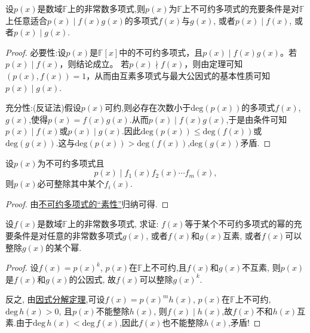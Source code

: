 \documentclass[../../main.tex]{subfiles}
\begin{document}
\begin{theorem}[不可约多项式的“素性”]\label{theorem:不可约多项式的“素性”}
设\(p(x)\)是数域\(\mathbb{F}\)上的非常数多项式,则\(p(x)\)为\(\mathbb{F}\)上不可约多项式的充要条件是对\(\mathbb{F}\)上任意适合\(p(x)\mid f(x)g(x)\)的多项式\(f(x)\)与\(g(x)\), 或者\(p(x)\mid f(x)\), 或者\(p(x)\mid g(x)\).
\end{theorem}
\begin{proof}
必要性:设\(p(x)\)是\(\mathbb{F}[x]\)中的不可约多项式，且\(p(x)\mid f(x)g(x)\)。若\(p(x)\mid f(x)\)，则结论成立。
若\(p(x)\nmid f(x)\)，则由定理可知\((p(x),f(x)) = 1\)，从而由互素多项式与最大公因式的基本性质可知\(p(x)\mid g(x)\).

充分性:(反证法)假设\(p(x)\)可约,则必存在次数小于\(\text{deg}(p(x))\)的多项式\(f(x)\),\(g(x)\),使得\(p(x) = f(x)g(x)\).从而\(p(x) \mid f(x)g(x)\),于是由条件可知\(p(x) \mid f(x)\)或\(p(x) \mid g(x)\).因此\(\text{deg}(p(x)) \leq \text{deg}(f(x))\)或\(\text{deg}(g(x))\).这与\(\text{deg}(p(x)) > \text{deg}(f(x))\),\(\text{deg}(g(x))\)矛盾.
\end{proof}

\begin{corollary}\label{corollary:不可约多项式“素性”的推论}
设\(p(x)\)为不可约多项式且
\[
p(x)\mid f_1(x)f_2(x)\cdots f_m(x),
\]
则\(p(x)\)必可整除其中某个\(f_i(x)\).
\end{corollary}
\begin{proof}
由\hyperref[theorem:不可约多项式的“素性”]{不可约多项式的“素性”}归纳可得.
\end{proof}

\begin{proposition}\label{proposition:多项式可以写成不可约多项式的幂的充要条件}
设\(f(x)\)是数域\(\mathbb{F}\)上的非常数多项式, 求证: \(f(x)\)等于某个不可约多项式的幂的充要条件是对任意的非常数多项式\(g(x)\), 或者\(f(x)\)和\(g(x)\)互素, 或者\(f(x)\)可以整除\(g(x)\)的某个幂.
\end{proposition}
\begin{proof}
设\(f(x)=p(x)^k\), \(p(x)\)在\(\mathbb{F}\)上不可约,且\(f(x)\)和\(g(x)\)不互素, 则\(p(x)\)是\(f(x)\)和\(g(x)\)的公因式, 故\(f(x)\)可以整除\(g(x)^k\).

反之, 由\hyperref[theorem:因式分解定理]{因式分解定理},可设\(f(x)=p(x)^mh(x)\), \(p(x)\)在\(\mathbb{F}\)上不可约, \(\mathrm{deg }\,h(x)>0\), 且\(p(x)\)不能整除\(h(x)\), 则\(f(x)\mid h(x)\),故$f(x)$不和$h(x)$互素.由于$\mathrm{deg}\,h(x)<\mathrm{deg }\,f(x)$,因此$f(x)$也不能整除\(h(x)\),矛盾!
\end{proof}
\end{document}
